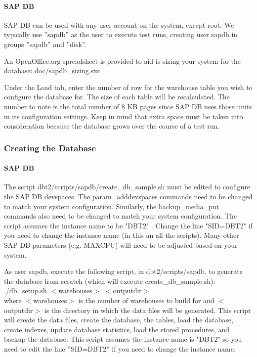 \documentclass{article}
\begin{document}
\paragraph{SAP DB}

SAP DB can be used with any user account on the system, except root.  We
typically use ''sapdb'' as the user to execute test runs, creating user sapdb
in groups ''sapdb'' and ''disk''.

An OpenOffice.org spreadsheet is provided to aid is sizing your system for
the database: doc/sapdb\_sizing.sxc

Under the Load tab, enter the number of row for the warehouse table you wish
to configure the database for.  The size of each table will be recalculated.
The number to note is the total number of 8 KB pages since SAP DB uses those
units in its configuration settings.  Keep in mind that extra space must be
taken into consideration because the database grows over the course of a test
run.

\subsubsection{Creating the Database}

\paragraph{SAP DB}

The script dbt2/scripts/sapdb/create\_db\_sample.sh must be edited to
configure the SAP DB devspaces.  The param\_adddevspaces commands need to be
changed to match your system configuration.  Similarly, the backup\_media\_put
commands also need to be changed to match your system configuration.  The
script assumes the instance name to be "DBT2" .  Change the line "SID=DBT2"
if you need to change the instance name (in this an all the scripts).  Many
other SAP DB parameters (e.g. MAXCPU) will need to be adjusted based on your
system.

As user sapdb, execute the following script, in dbt2/scripts/sapdb, to
generate the database from scratch (which will execute create\_db\_sample.sh): \\
./db\_setup.sh $<$warehouses$>$ $<$outputdir$>$ \\
where $<$warehouses$>$ is the number of warehouses to build for and $<$outputdir$>$
is the directory in which the data files will be generated.  This script will
create the data files, create the database, the tables, load the database,
create indexes, update database statistics, load the stored procedures, and
backup the database.  This script assumes the instance name is "DBT2" so you
need to edit the line ''SID=DBT2'' if you need to change the instance name.
\end{document}
